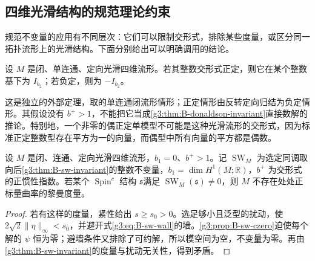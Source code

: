\subsection{四维光滑结构的规范理论约束}
\label{g3:subsec:B04:07}

规范不变量的应用有不同层次：它们可以限制交形式，排除某些度量，或区分同一拓扑流形上的光滑结构。下面分别给出可以明确调用的结论。

\begin{theorem}[Donaldson 定理]\label{g3:thm:B-donaldson-definite}
 设 \(M\) 是闭、单连通、定向光滑四维流形。若其整数交形式正定，则它在某个整数基下为 \(I_{b_2}\)；若负定，则为 \(-I_{b_2}\)。
\end{theorem}

这是独立的外部定理，取\cite[第2.4.3节，定理2.4.18及其证明]{Nicolaescu2000SeibergWitten}的单连通闭流形情形；正定情形由反转定向归结为负定情形。其假设没有 \(b^+>1\)，不能把它当成\cref{g3:thm:B-donaldson-invariant}直接数解的推论。特别地，一个非零的偶正定单模型不可能是这种光滑流形的交形式，因为标准正定整数型存在平方为一的向量，而偶型中所有向量的平方都是偶数。

\begin{corollary}\label{g3:cor:B-sw-positive-scalar-obstruction}
 设 \(M\) 是闭、连通、定向光滑四维流形，\(b_1=0\)、\(b^+>1\)。记 \(\operatorname{SW}_M\) 为选定同调取向后\cref{g3:thm:B-sw-invariant}的整数不变量，\(b_1=\dim H^1(M;\mathbb R)\)，\(b^+\) 为交形式的正惯性指数。若某个 \(\operatorname{Spin}^c\) 结构 \(\mathfrak s\)满足 \(\operatorname{SW}_M(\mathfrak s)\ne0\)，则 \(M\) 不存在处处正标量曲率的黎曼度量。
\end{corollary}
\begin{proof}
 若有这样的度量，紧性给出 \(s\ge s_0>0\)。选足够小且泛型的扰动，使 \(2\sqrt2\|\eta\|_\infty<s_0\)，并避开式\eqref{g3:eq:B-sw-wall}的墙。\cref{g3:prop:B-sw-czero}迫使每个解的 \(\psi\) 恒为零；避墙条件又排除了可约解，所以模空间为空，不变量为零。再由\cref{g3:thm:B-sw-invariant}的度量与扰动无关性，得到矛盾。
\end{proof}

